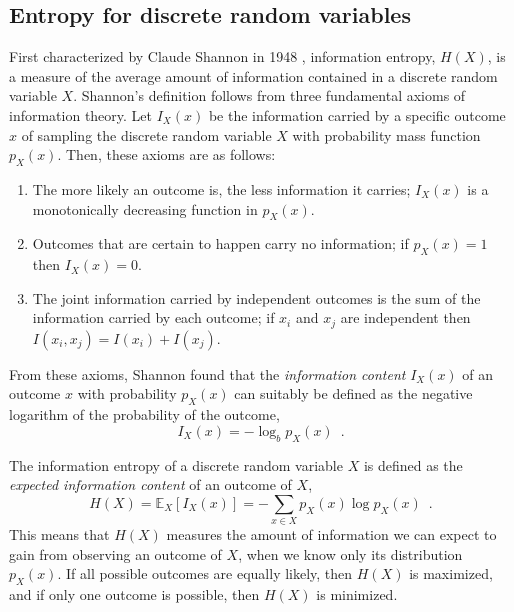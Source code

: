\subsection{Entropy for discrete random variables}

First characterized by Claude Shannon in 1948 \parencite{shannon_mathematical_1948}, information entropy, $H(X)$, is a measure of the average amount of information contained in a discrete random variable $X$. Shannon's definition follows from three fundamental axioms of information theory. Let $I_X(x)$ be the information carried by a specific outcome $x$ of sampling the discrete random variable $X$ with probability mass function $p_X(x)$. Then, these axioms are as follows:
\begin{enumerate}[label=(\Roman*)]
    \item The more likely an outcome is, the less information it carries; $I_X(x)$ is a monotonically decreasing function in $p_X(x)$.
    \item Outcomes that are certain to happen carry no information; if $p_X(x) = 1$ then $I_X(x) = 0$.
    \item The joint information carried by independent outcomes is the sum of the information carried by each outcome; if $x_i$ and $x_j$ are independent then $I(x_i, x_j) = I(x_i) + I(x_j)$. 
\end{enumerate}

From these axioms, Shannon found that the \emph{information content} $I_X(x)$ of an outcome $x$ with probability $p_X(x)$ can suitably be defined as the negative logarithm of the probability of the outcome,
%
\begin{equation} \label{eq:information-content}
    I_X(x) = -\log_b p_X(x) \enspace .
\end{equation}
%

The information entropy of a discrete random variable $X$ is defined as the \emph{expected information content} of an outcome of $X$,
%
\begin{equation} \label{eq:information-entropy}
    H(X) = \mathbb{E}_X\left[I_X(x)\right] = - \sum_{x\in X} p_X(x) \log p_X(x) \enspace .
\end{equation}
%
This means that $H(X)$ measures the amount of information we can expect to gain from observing an outcome of $X$, when we know only its distribution $p_X(x)$. If all possible outcomes are equally likely, then $H(X)$ is maximized, and if only one outcome is possible, then $H(X)$ is minimized.



